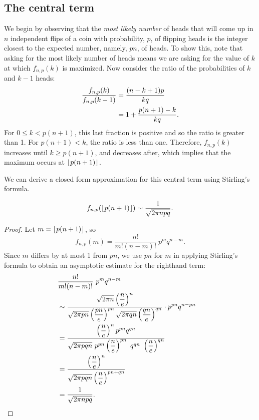 \documentclass[11pt,twoside]{article}
\begin{document}
\subsection{The central term}
We begin by observing that the \emph{most likely number} of heads that will
come up in $n$ independent flips of a coin with probability, $p$, of
flipping heads is the integer closest to the expected number, namely, $pn$,
of heads.  To show this, note that asking for the most likely number of
heads means we are asking for the value of $k$ at which $f_{n,p}(k)$ is
maximized.  Now consider the ratio of the probabilities of $k$ and $k-1$
heads:
\begin{align}
\frac{f_{n,p}(k)}{f_{n,p}(k-1)} &= \frac{(n-k+1)p}{kq}\label{ratk}\\
&= 1+\frac{p(n+1)-k}{kq}.\notag
\end{align}
For $0 \le k < p(n+1)$, this last fraction is positive and so the ratio is
greater than 1.  For $p(n+1) < k$, the ratio is less than one.
Therefore, $f_{n,p}(k)$ increases until $k \ge p(n+1)$, and decreases
after, which implies that the maximum occurs at $\left\lfloor p(n+1)\right\rfloor$.

We can derive a closed form approximation for this central term using
Stirling's formula.  
\begin{lemma}
\begin{equation}\label{central term}
f_{n,p}(\left\lfloor p(n+1)\right\rfloor) \sim \frac{1}{\sqrt{2 \pi n p q}}.
\end{equation}

\begin{proof}
Let $m = \left\lfloor p(n+1)\right\rfloor$, so
\[
f_{n,p}(m) = \frac{n!}{m!(n-m)!}\ p^mq^{n-m}.
\]
Since $m$ differs by at most 1 from $pn$, we use $pn$ for $m$ in applying
Stirling's formula to obtain an asymptotic estimate for the righthand term:
\begin{align*}
\lefteqn{\frac{n!}{m!(n-m)!}\ p^mq^{n-m}}\\
 & \sim \frac{\sqrt{2\pi n}\paren{\dfrac{n}{e}}^n}
{\sqrt{2\pi pn}\paren{\dfrac{pn}{e}}^{pn} \sqrt{2\pi
    qn}\paren{\dfrac{qn}{e}}^{qn}} \cdot p^{pn}q^{n-pn}\\
& =  \frac{\paren{\dfrac{n}{e}}^n p^{pn}q^{qn}}
{\sqrt{2\pi pqn}\ p^{pn}\paren{\dfrac{n}{e}}^{pn}\ q^{qn}\ 
  \paren{\dfrac{n}{e}}^{qn}}\\
& = \frac{\paren{\dfrac{n}{e}}^n}
{\sqrt{2\pi pqn}\paren{\dfrac{n}{e}}^{pn + qn}}\\
& = \frac{1}{\sqrt{2 \pi n p q}}.
\end{align*}

\end{proof}
\end{lemma}
\end{document}
